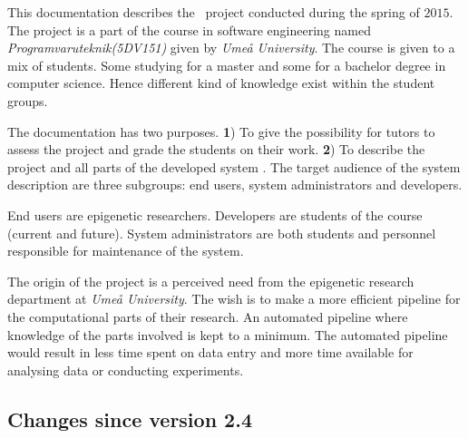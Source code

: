 \thispagestyle{preface}

%
%

This documentation describes the \appName\ project conducted during the spring of $2015$. The project is a part of the course in software engineering named \textit{Programvaruteknik(5DV151)} given by \textit{Umeå University}. The course is given to a mix of students. Some studying for a master and some for a bachelor degree in computer science. Hence different kind of knowledge exist within the student groups.

The documentation has two purposes. \textbf{1}) To give the possibility for tutors to assess the project and grade the students on their work. \textbf{2}) To describe the project and all parts of the developed system . 
The target audience of the system description are three subgroups: end users, system administrators and developers.

End users are epigenetic researchers. Developers are students of the course (current and future). System administrators are both students and personnel responsible for maintenance of the system.

The origin of the project is a perceived need from the epigenetic research department at \textit{Umeå University}. The wish is to make a more efficient pipeline for the computational parts of their research. An automated pipeline where knowledge of the parts involved is kept to a minimum. The automated pipeline would result in less time spent on  data entry and more time available for analysing data or conducting experiments.

\subsection*{Changes since version 2.4}\vspace*{-10pt}
\begin{tabularx}{\textwidth}{lX}

\end{tabularx}

